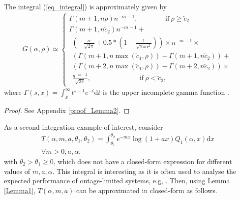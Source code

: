 \begin{lem}\label{Lemma2}
The integral (\ref{eq_integral}) is approximately given by
\begin{align}
G(\alpha,\rho)\simeq
\begin{cases}
\Gamma(m+1,n\rho)n^{-m-1}, ~~~~~~~~~~~~~~~~~~\mathrm{if}~  \rho \geq \breve{c}_2  \\ 
\Gamma(m+1,n\breve{c}_2)n^{-m-1} + \\
~~\left(-\frac{\alpha}{\sqrt{2\pi}}+0.5*\left(1-\frac{1}{\sqrt{2\pi\alpha^2}}\right)\right)\times n^{-m-1}\times\\
~~\left(\Gamma(m+1,n\max(\breve{c}_1,\rho))-\Gamma(m+1,n\breve{c}_2)\right)+\\
~~\left(\Gamma(m+2,n\max(\breve{c}_1,\rho))-\Gamma(m+2,n\breve{c}_2)\right)\times\\
~~\frac{n^{-m-2}}{\sqrt{2\pi}},
~~~~~~~~~~~~~~~~~~~~~~~~~~~~~~~~\mathrm{if}~  \rho<\breve{c}_2,
\end{cases}
\end{align}
where $\Gamma(s,x) = \int_{x}^{\infty} t^{s-1}e^{-t} \mathrm{d}t$ is the upper incomplete gamma function \cite[Eq. 6.5.1]{abramowitz1999ia}.
\end{lem}
\begin{proof}
See Appendix \ref{proof_Lemma2}. 
\end{proof}









As a second integration example of interest, consider
\begin{align}\label{eq_integralT}
    T(\alpha,m,a,\theta_1,\theta_2) = \int_{\theta_1}^{\theta_2} e^{-mx}\log(1+ax)Q_1(\alpha,x)\text{d}x \nonumber\\\forall m>0,a,\alpha,
\end{align}
with $\theta_2>\theta_1\geq0$, which does not have a closed-form expression for different values of $m, a, \alpha$. This integral is interesting as it is often used to analyse the expected performance of outage-limited systems, e.g,  \cite{Simon2003TWCsome,Simon2000TCexponential,Gaur2003TVTsome,6911973}. Then, using Lemma \ref{Lemma1}, $T(\alpha,m,a)$ can be approximated in closed-form as  follows.

